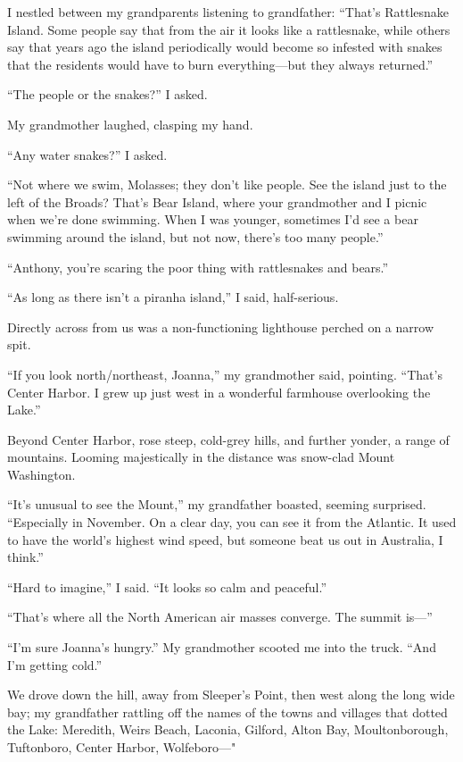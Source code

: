 I nestled between my grandparents listening to grandfather: ``That's
Rattlesnake Island. Some people say that from the air it looks like a
rattlesnake, while others say that years ago the island periodically
would become so infested with snakes that the residents would have to
burn everything---but they always returned.''

``The people or the snakes?'' I asked.

My grandmother laughed, clasping my hand.

``Any water snakes?'' I asked.

``Not where we swim, Molasses; they don't like people. See the island
just to the left of the Broads? That's Bear Island, where your
grandmother and I picnic when we're done swimming. When I was younger,
sometimes I'd see a bear swimming around the island, but not now,
there's too many people.''

``Anthony, you're scaring the poor thing with rattlesnakes and bears.''

``As long as there isn't a piranha island,'' I said, half-serious.

Directly across from us was a non-functioning lighthouse perched on a
narrow spit.

``If you look north/northeast, Joanna,'' my grandmother said, pointing.
``That's Center Harbor. I grew up just west in a wonderful farmhouse
overlooking the Lake.''

Beyond Center Harbor, rose steep, cold-grey hills, and further yonder, a
range of mountains. Looming majestically in the distance was snow-clad
Mount Washington.

``It's unusual to see the Mount,'' my grandfather boasted, seeming
surprised. ``Especially in November. On a clear day, you can see it from
the Atlantic. It used to have the world's highest wind speed, but
someone beat us out in Australia, I think.''

``Hard to imagine,'' I said. ``It looks so calm and peaceful.''

``That's where all the North American air masses converge. The summit
is---''

``I'm sure Joanna's hungry.'' My grandmother scooted me into the truck.
``And I'm getting cold.''

We drove down the hill, away from Sleeper's Point, then west along the
long wide bay; my grandfather rattling off the names of the towns and
villages that dotted the Lake: Mere\-dith, Weirs Beach, Laconia, Gilford,
Alton Bay, Moultonborough, Tuftonboro, Center Harbor, Wolfeboro---"

